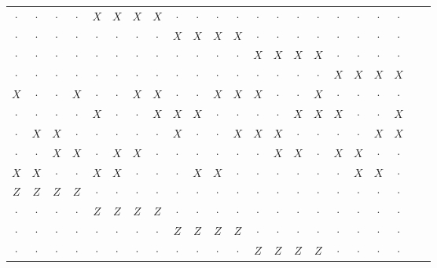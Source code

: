 \begin{table}
\begin{minipage}{0.6\textwidth}
\begin{tabular}{cccccccccccccccccccccc}
$\cdot$& $\cdot$& $\cdot$& $\cdot$& $X$& $X$& $X$& $X$& $\cdot$& $\cdot$& $\cdot$& $\cdot$& $\cdot$& $\cdot$& $\cdot$& $\cdot$& $\cdot$& $\cdot$& $\cdot$& $\cdot$&\\
$\cdot$& $\cdot$& $\cdot$& $\cdot$& $\cdot$& $\cdot$& $\cdot$& $\cdot$& $X$& $X$& $X$& $X$& $\cdot$& $\cdot$& $\cdot$& $\cdot$& $\cdot$& $\cdot$& $\cdot$& $\cdot$&\\
$\cdot$& $\cdot$& $\cdot$& $\cdot$& $\cdot$& $\cdot$& $\cdot$& $\cdot$& $\cdot$& $\cdot$& $\cdot$& $\cdot$& $X$& $X$& $X$& $X$& $\cdot$& $\cdot$& $\cdot$& $\cdot$&\\
$\cdot$& $\cdot$& $\cdot$& $\cdot$& $\cdot$& $\cdot$& $\cdot$& $\cdot$& $\cdot$& $\cdot$& $\cdot$& $\cdot$& $\cdot$& $\cdot$& $\cdot$& $\cdot$& $X$& $X$& $X$& $X$&\\
$X$& $\cdot$& $\cdot$& $X$& $\cdot$& $\cdot$& $X$& $X$& $\cdot$& $\cdot$& $X$& $X$& $X$& $\cdot$& $\cdot$& $X$& $\cdot$& $\cdot$& $\cdot$& $\cdot$&\\
$\cdot$& $\cdot$& $\cdot$& $\cdot$& $X$& $\cdot$& $\cdot$& $X$& $X$& $X$& $\cdot$& $\cdot$& $\cdot$& $\cdot$& $X$& $X$& $X$& $\cdot$& $\cdot$& $X$&\\
$\cdot$& $X$& $X$& $\cdot$& $\cdot$& $\cdot$& $\cdot$& $\cdot$& $X$& $\cdot$& $\cdot$& $X$& $X$& $X$& $\cdot$& $\cdot$& $\cdot$& $\cdot$& $X$& $X$&\\
$\cdot$& $\cdot$& $X$& $X$& $\cdot$& $X$& $X$& $\cdot$& $\cdot$& $\cdot$& $\cdot$& $\cdot$& $\cdot$& $X$& $X$& $\cdot$& $X$& $X$& $\cdot$& $\cdot$&\\
$X$& $X$& $\cdot$& $\cdot$& $X$& $X$& $\cdot$& $\cdot$& $\cdot$& $X$& $X$& $\cdot$& $\cdot$& $\cdot$& $\cdot$& $\cdot$& $\cdot$& $X$& $X$& $\cdot$&\\
\hline
$Z$& $Z$& $Z$& $Z$& $\cdot$& $\cdot$& $\cdot$& $\cdot$& $\cdot$& $\cdot$& $\cdot$& $\cdot$& $\cdot$& $\cdot$& $\cdot$& $\cdot$& $\cdot$& $\cdot$& $\cdot$& $\cdot$&\\
$\cdot$& $\cdot$& $\cdot$& $\cdot$& $Z$& $Z$& $Z$& $Z$& $\cdot$& $\cdot$& $\cdot$& $\cdot$& $\cdot$& $\cdot$& $\cdot$& $\cdot$& $\cdot$& $\cdot$& $\cdot$& $\cdot$&\\
$\cdot$& $\cdot$& $\cdot$& $\cdot$& $\cdot$& $\cdot$& $\cdot$& $\cdot$& $Z$& $Z$& $Z$& $Z$& $\cdot$& $\cdot$& $\cdot$& $\cdot$& $\cdot$& $\cdot$& $\cdot$& $\cdot$&\\
$\cdot$& $\cdot$& $\cdot$& $\cdot$& $\cdot$& $\cdot$& $\cdot$& $\cdot$& $\cdot$& $\cdot$& $\cdot$& $\cdot$& $Z$& $Z$& $Z$& $Z$& $\cdot$& $\cdot$& $\cdot$& $\cdot$&\\

\end{tabular}
\end{minipage}
\end{table}
